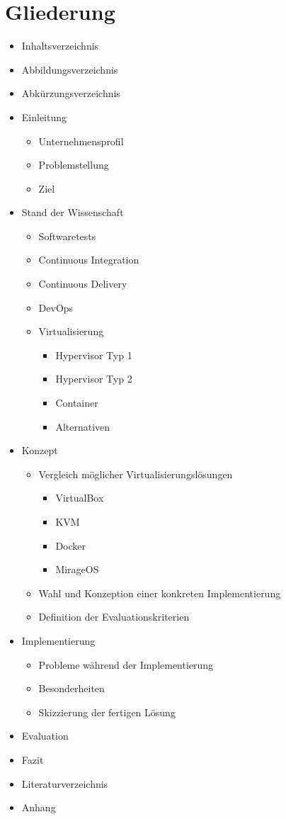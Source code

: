\section{Gliederung}

\begin{itemize}
\item Inhaltsverzeichnis
\item Abbildungsverzeichnis
\item Abkürzungsverzeichnis
\item Einleitung
    \begin{itemize}
    \item Unternehmensprofil
    \item Problemstellung
    \item Ziel
    \end{itemize}
\item Stand der Wissenschaft
    \begin{itemize}
    \item Softwaretests
    \item Continuous Integration
    \item Continuous Delivery
    \item DevOps
    \item Virtualisierung
        \begin{itemize}
        \item Hypervisor Typ 1
        \item Hypervisor Typ 2
        \item Container
        \item Alternativen
        \end{itemize}
    \end{itemize}
\item Konzept
    \begin{itemize}
    \item Vergleich möglicher Virtualisierungslösungen
        \begin{itemize}
        \item VirtualBox
        \item KVM
        \item Docker
        \item MirageOS
        \end{itemize}
    \item Wahl und Konzeption einer konkreten Implementierung
    \item Definition der Evaluationskriterien
    \end{itemize}
\item Implementierung
    \begin{itemize}
    \item Probleme während der Implementierung
    \item Besonderheiten
    \item Skizzierung der fertigen Lösung
    \end{itemize}
\item Evaluation
\item Fazit
\item Literaturverzeichnis
\item Anhang
\end{itemize}
